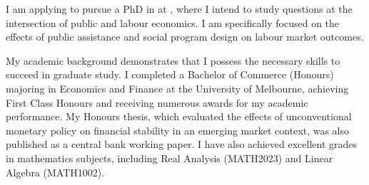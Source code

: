  I am applying to pursue a PhD in \program{} at \school, where I intend to study questions at the intersection of public and labour economics. I am specifically focused on the effects of public assistance and social program design on labour market outcomes.

 My academic background demonstrates that I possess the necessary skills to succeed in
graduate study. I completed a Bachelor of Commerce (Honours) majoring in Economics and Finance at the University of Melbourne, achieving First Class Honours and receiving numerous awards for my academic performance. My Honours thesis, which evaluated the effects of unconventional monetary policy on financial stability in an emerging market context, was also published as a central bank working paper. I have also achieved excellent grades in mathematics subjects, including Real Analysis (MATH2023) and Linear Algebra (MATH1002).


